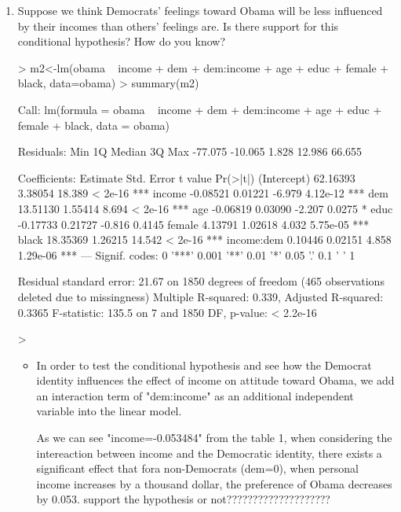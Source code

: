\documentclass[12pt]{article}
\begin{document}
\begin{enumerate}
\item Suppose we think Democrats' feelings toward Obama will be less influenced by their incomes than others' feelings are.  Is there support for this conditional hypothesis?  How do you know?\\

\begin{Schunk}
\begin{Sinput}
> m2<-lm(obama ~ income + dem + dem:income + age + educ + female + black, data=obama)
> summary(m2)
\end{Sinput}
\begin{Soutput}
Call:
lm(formula = obama ~ income + dem + dem:income + age + educ + 
    female + black, data = obama)

Residuals:
    Min      1Q  Median      3Q     Max 
-77.075 -10.065   1.828  12.986  66.655 

Coefficients:
            Estimate Std. Error t value Pr(>|t|)    
(Intercept) 62.16393    3.38054  18.389  < 2e-16 ***
income      -0.08521    0.01221  -6.979 4.12e-12 ***
dem         13.51130    1.55414   8.694  < 2e-16 ***
age         -0.06819    0.03090  -2.207   0.0275 *  
educ        -0.17733    0.21727  -0.816   0.4145    
female       4.13791    1.02618   4.032 5.75e-05 ***
black       18.35369    1.26215  14.542  < 2e-16 ***
income:dem   0.10446    0.02151   4.858 1.29e-06 ***
---
Signif. codes:  0 '***' 0.001 '**' 0.01 '*' 0.05 '.' 0.1 ' ' 1

Residual standard error: 21.67 on 1850 degrees of freedom
  (465 observations deleted due to missingness)
Multiple R-squared:  0.339,	Adjusted R-squared:  0.3365 
F-statistic: 135.5 on 7 and 1850 DF,  p-value: < 2.2e-16
\end{Soutput}
\begin{Sinput}
> 
\end{Sinput}
\end{Schunk}
\begin{itemize}
  \item In order to test the conditional hypothesis and see how the Democrat identity influences the effect of income on attitude toward Obama, we add an interaction term of "dem:income" as an additional independent variable into the linear model.  
  
As we can see "income=-0.053484" from the table 1, when considering the intereaction between income and the Democratic identity, there exists a significant effect that fora non-Democrats (dem=0), when personal income increases by a thousand dollar, the preference of Obama decreases by 0.053. support the hypothesis or not????????????????????



\end{itemize}
\end{enumerate}
\end{document}
